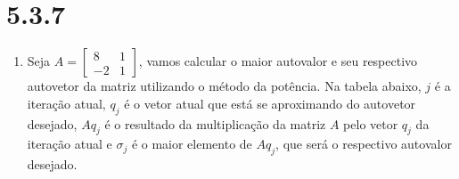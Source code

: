 \documentclass[a4paper,11pt]{article}
\begin{document}
    \section*{5.3.7}
        \begin{enumerate}[label=\textbf{(\alph*)}]
            \item Seja $A = \begin{bmatrix}
                        8 & 1 \\
                        -2 & 1
                    \end{bmatrix}$, vamos calcular o maior autovalor e seu respectivo autovetor da matriz utilizando o método da potência. Na tabela abaixo, $j$ é a iteração atual, $q_j$ é o vetor atual que está se aproximando do autovetor desejado, $Aq_j$ é o resultado da multiplicação da matriz $A$ pelo vetor $q_j$ da iteração atual e $\sigma_j$ é o maior elemento de $Aq_j$, que será o respectivo autovalor desejado.
            

\end{enumerate}
\end{document}
